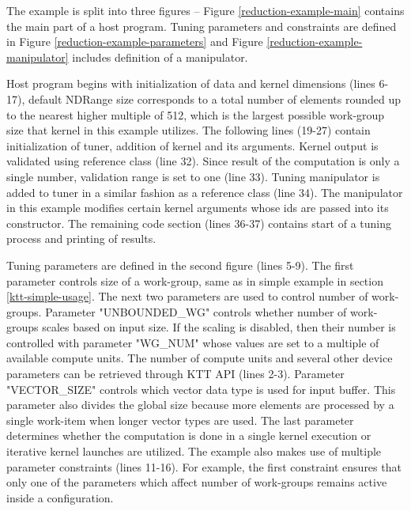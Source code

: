 \documentclass
[
    digital, %
    oneside, %
    table, %
    nolof, %
    nolot, %
    nocover %
]{fithesis3}
\begin{document}
The example is split into three figures -- Figure \ref{reduction-example-main} contains the main part of a host program. Tuning parameters and
constraints are defined in Figure \ref{reduction-example-parameters} and Figure \ref{reduction-example-manipulator} includes definition of a
manipulator.

Host program begins with initialization of data and kernel dimensions (lines 6-17), default NDRange size corresponds to a total number of elements
rounded up to the nearest higher multiple of 512, which is the largest possible work-group size that kernel in this example utilizes. The following
lines (19-27) contain initialization of tuner, addition of kernel and its arguments. Kernel output is validated using reference class (line 32).
Since result of the computation is only a single number, validation range is set to one (line 33). Tuning manipulator is added to tuner in a similar
fashion as a reference class (line 34). The manipulator in this example modifies certain kernel arguments whose ids are passed into its constructor.
The remaining code section (lines 36-37) contains start of a tuning process and printing of results.

Tuning parameters are defined in the second figure (lines 5-9). The first parameter controls size of a work-group, same as in simple example in
section \ref{ktt-simple-usage}. The next two parameters are used to control number of work-groups. Parameter "UNBOUNDED\_WG" controls whether number
of work-groups scales based on input size. If the scaling is disabled, then their number is controlled with parameter "WG\_NUM" whose values are set
to a multiple of available compute units. The number of compute units and several other device parameters can be retrieved through KTT API
(lines 2-3). Parameter "VECTOR\_SIZE" controls which vector data type is used for input buffer. This parameter also divides the global size because
more elements are processed by a single work-item when longer vector types are used. The last parameter determines whether the computation is done
in a single kernel execution or iterative kernel launches are utilized. The example also makes use of multiple parameter constraints (lines 11-16).
For example, the first constraint ensures that only one of the parameters which affect number of work-groups remains active inside a configuration.
\end{document}
